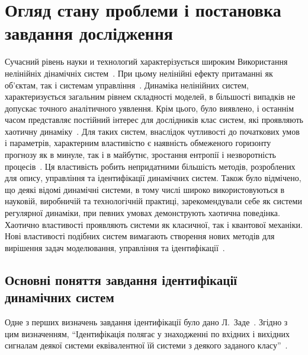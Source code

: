 \chapter{Огляд стану проблеми і постановка завдання дослідження}

Сучасний рівень науки и технологий характерізується широким
Використання нелінійніх дінамічніх систем~\cite{andronov_vitt_haikin,
anisch_nonlin_eff, mishenko_du_small_relax, nonlin_vibro, malinetskii_modern_methods_nl_dyn}. При цьому
нелінійні ефекту притаманні як об'єктам, так і системам
управління~\cite{kubik_nlsc, vukobr_nonadopt}. Динаміка нелінійних систем,
характеризується загальним рівнем складності моделей,
в більшості випадків не допускає точного аналітичного
уявлення. Крім цього, було виявлено, і останнім часом представляє
постійний інтерес для дослідників клас систем, які проявляють
хаотичну динаміку~\cite{moon_chaotic_vibr, magni_theory_dyn_chaos, kuznetsov_dyn_chaos,
neimark_stoch_chaos_vibro, anisch_reg_and_chaotic_vibro}. Для таких систем, внаслідок
чутливості до початкових умов і параметрів, характерним
властивістю є наявність обмеженого горизонту прогнозу як в
минуле, так і в майбутнє, зростання ентропії і незворотність
процесів~\cite{chernavskii_syn_info, prigogine_from_existent, koltsova_nl_dyn_chem}. Ця
властивість робить непридатними більшість методів, розроблених
для опису, управління та ідентифікації динамічних систем. Також
було відмічено, що деякі відомі динамічні системи, в тому числі
широко використовуються в науковій, виробничій та технологічній
практиці, зарекомендували себе як системи регулярної динаміки,
при певних умовах демонструють хаотична поведінка. Хаотично
властивості проявляють системи як класичної, так і квантової
механіки. Нові властивості подібних систем вимагають створення
нових методів для вирішення задач моделювання, управління та
ідентифікації~\cite{karabutov_adapt_id_sys, dmitriev_trans_chaos_lowpower}.


\section{Основні поняття завдання ідентифікації динамічних систем} %

Одне з перших визначень завдання ідентифікації було дано
Л.~Заде~\cite{zadeh_id_1956}. Згідно з цим визначенням,
``Ідентифікація
полягає у знаходженні по вхідних і вихідних сигналам деякої
системи еквівалентної їй системи з деякого заданого
класу''~\cite{eykhoff_id_base, eykhoff_modern_id, lung_id_sys}.


